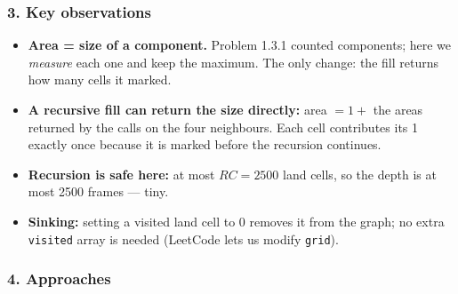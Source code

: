 \subsubsection*{3. Key observations}

\begin{itemize}[leftmargin=*]
    \item \textbf{Area = size of a component.} Problem 1.3.1 counted components; here we \emph{measure} each one and keep the maximum. The only change: the fill returns how many cells it marked.
    \item \textbf{A recursive fill can return the size directly:} area $= 1 + $ the areas returned by the calls on the four neighbours. Each cell contributes its 1 exactly once because it is marked before the recursion continues.
    \item \textbf{Recursion is safe here:} at most $RC = 2500$ land cells, so the depth is at most 2500 frames --- tiny.
    \item \textbf{Sinking:} setting a visited land cell to $0$ removes it from the graph; no extra \texttt{visited} array is needed (LeetCode lets us modify \texttt{grid}).
\end{itemize}

\subsubsection*{4. Approaches}

